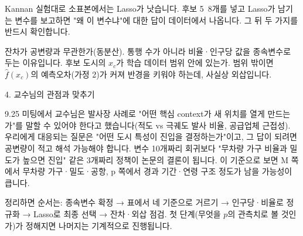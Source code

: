 Kannan 실험대로 소표본에서는 Lasso가 낫습니다. 후보 5~8개를 넣고 Lasso가 남기는 변수를 보고하면 "왜 이 변수냐"에 대한 답이 데이터에서 나옵니다. 그 뒤 두 가지를 반드시 확인합니다.

잔차가 공변량과 무관한가(동분산). 통행 수가 아니라 비율·인구당 값을 종속변수로 두는 이유입니다.
후보 도시의 $x_c$가 학습 데이터 범위 안에 있는가. 범위 밖이면 $\hat f(x_c)$의 예측오차(가정 2)가 커져 반경을 키워야 하는데, 사실상 외삽입니다.

4. 교수님의 관점과 맞추기

9.25 미팅에서 교수님은 발사장 사례로 "어떤 핵심 context가 새 위치를 열게 만드는가"를 말할 수 있어야 한다고 했습니다(적도 vs 극궤도 발사 비율, 공급업체 근접성). 우리에게 대응되는 질문은 "어떤 도시 특성이 진입을 결정하는가"이고, 그 답이 되려면 공변량이 적고 해석 가능해야 합니다. 변수 10개짜리 회귀보다 "무차량 가구 비율과 밀도가 높으면 진입" 같은 3개짜리 정책이 논문의 결론이 됩니다. 이 기준으로 보면 M 쪽에서 무차량 가구·밀도·공항, p 쪽에서 경과 기간·연령 구조 정도가 남을 가능성이 큽니다.

정리하면 순서는: 종속변수 확정 → 표에서 네 기준으로 거르기 → 인구당·비율로 정규화 → Lasso로 최종 선택 → 잔차·외삽 점검. 첫 단계(무엇을 $p$의 관측치로 볼 것인가)가 정해지면 나머지는 기계적으로 진행됩니다.